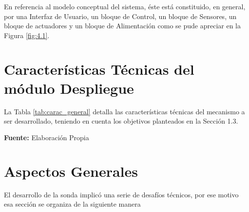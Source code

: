 En referencia al modelo conceptual del sistema, éste está constituido, en general, por una Interfaz de Usuario, un bloque de Control, un bloque de Sensores, un bloque de actuadores y un bloque de Alimentación  como se pude apreciar en la Figura \ref{fig:4.1}.



\section[Características Técnicas de los módulos]{Características Técnicas del módulo Despliegue}
La Tabla \ref{tab:carac_general} detalla las características técnicas del mecanismo a ser desarrollado, teniendo en cuenta los objetivos planteados en la Sección 1.3.
\begin{table}[H]
\protect\caption[Datos Técnicos]{Datos Técnicos. \label{tab:carac_general}}
    \centering
    \vspace{5mm}
    \newline
    \hfill \textbf{Fuente:} Elaboración Propia
\end{table}


\section{Aspectos Generales}
El desarrollo de la sonda implic\'o una serie de desaf\'ios t\'ecnicos, por ese motivo esa secci\'on se organiza de la siguiente manera

